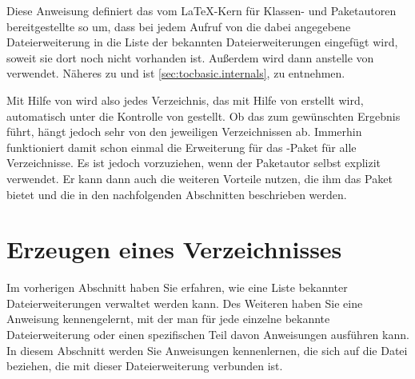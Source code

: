 \begin{Declaration}
\end{Declaration}
Diese Anweisung definiert das vom \LaTeX-Kern für Klassen- und Paketautoren
bereitgestellte
\important{\Macro{\@starttoc}} so um,
dass bei jedem Aufruf von  die dabei angegebene
Dateierweiterung in die Liste der bekannten Dateierweiterungen eingefügt wird,
soweit sie dort noch nicht vorhanden ist. Außerdem wird dann
 anstelle von 
verwendet. Näheres zu  und
 ist \autoref{sec:tocbasic.internals},
 zu entnehmen.

Mit Hilfe von  wird also jedes Verzeichnis, das mit
Hilfe von  erstellt wird, automatisch unter die Kontrolle von
 gestellt. Ob das zum gewünschten Ergebnis führt, hängt
jedoch sehr von den jeweiligen Verzeichnissen ab. Immerhin funktioniert damit
schon einmal die Erweiterung für das -Paket für alle
Verzeichnisse. Es ist jedoch vorzuziehen, wenn der Paketautor selbst
 explizit verwendet. Er kann dann auch die weiteren Vorteile
nutzen, die ihm das Paket bietet und die in den nachfolgenden Abschnitten
beschrieben werden.%
\EndIndexGroup


\section{Erzeugen eines Verzeichnisses}

Im vorherigen Abschnitt haben Sie erfahren, wie eine Liste bekannter
Dateierweiterungen verwaltet werden kann. Des Weiteren haben Sie eine Anweisung kennengelernt, mit der man
für jede einzelne bekannte Dateierweiterung oder einen spezifischen Teil davon
Anweisungen ausführen kann. In diesem Abschnitt werden Sie Anweisungen
kennenlernen, die sich auf die Datei beziehen, die mit dieser Dateierweiterung
verbunden ist.


